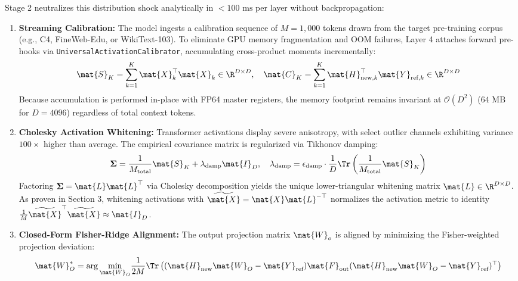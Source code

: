 Stage 2 neutralizes this distribution shock analytically in $<100\text{ ms}$ per layer without backpropagation:
\begin{enumerate}
    \item \textbf{Streaming Calibration:} The model ingests a calibration sequence of $M = 1{,}000$ tokens drawn from the target pre-training corpus (e.g., C4, FineWeb-Edu, or WikiText-103). To eliminate GPU memory fragmentation and OOM failures, Layer 4 attaches forward pre-hooks via \texttt{UniversalActivationCalibrator}, accumulating cross-product moments incrementally:
    \begin{equation}
        \mat{S}_K = \sum_{k=1}^K \mat{X}_k^\top \mat{X}_k \in \R^{D \times D}, \quad \mat{C}_K = \sum_{k=1}^K \mat{H}_{\text{new}, k}^\top \mat{Y}_{\text{ref}, k} \in \R^{D \times D}
        \label{eq:streaming_gram_accum}
    \end{equation}
    Because accumulation is performed in-place with FP64 master registers, the memory footprint remains invariant at $\mathcal{O}(D^2)$ ($64\text{ MB}$ for $D=4096$) regardless of total context tokens.
    \item \textbf{Cholesky Activation Whitening:} Transformer activations display severe anisotropy, with select outlier channels exhibiting variance $100\times$ higher than average. The empirical covariance matrix is regularized via Tikhonov damping:
    \begin{equation}
        \boldsymbol{\Sigma} = \frac{1}{M_{\text{total}}} \mat{S}_K + \lambda_{\text{damp}} \mat{I}_D, \quad \lambda_{\text{damp}} = \epsilon_{\text{damp}} \cdot \frac{1}{D} \Tr\left(\frac{1}{M_{\text{total}}} \mat{S}_K\right)
        \label{eq:tikhonov_cov}
    \end{equation}
    Factoring $\boldsymbol{\Sigma} = \mat{L}\mat{L}^\top$ via Cholesky decomposition yields the unique lower-triangular whitening matrix $\mat{L} \in \R^{D \times D}$. As proven in Section 3, whitening activations with $\widetilde{\mat{X}} = \mat{X} \mat{L}^{-\top}$ normalizes the activation metric to identity $\frac{1}{M} \widetilde{\mat{X}}^\top \widetilde{\mat{X}} \approx \mat{I}_D$.
    \item \textbf{Closed-Form Fisher-Ridge Alignment:} The output projection matrix $\mat{W}_o$ is aligned by minimizing the Fisher-weighted projection deviation:
    \begin{equation}
    \begin{split}
        \mat{W}_O^* = \arg\min_{\mat{W}_O} & \frac{1}{2M} \Tr\left( (\mat{H}_{\text{new}} \mat{W}_O - \mat{Y}_{\text{ref}}) \mat{F}_{\text{out}} (\mat{H}_{\text{new}} \mat{W}_O - \mat{Y}_{\text{ref}})^\top \right) \\

\end{split}
\end{equation}
\end{enumerate}
